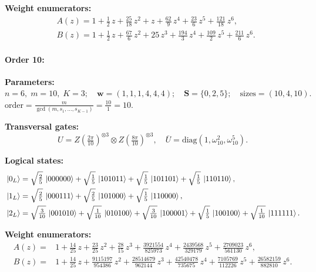 \documentclass[pdflatex,sn-nature]{sn-jnl}%
\theoremstyle{thmstyleone}%
\theoremstyle{thmstyletwo}%
\theoremstyle{thmstylethree}%
\begin{document}
\begin{appendices}
\noindent\textbf{Weight enumerators:}
\begin{align*}
    &A(z) = 1 + \tfrac{1}{2}\,z + \tfrac{25}{18}\,z^{2} + z + \tfrac{62}{9}\,z^{4} + \tfrac{23}{6}\,z^{5} + \tfrac{121}{18}\,z^{6}, \\
    &B(z) = 1 + \tfrac{1}{2}\,z + \tfrac{67}{6}\,z^{2} + 25\,z^{3} + \tfrac{194}{3}\,z^{4} + \tfrac{109}{2}\,z^{5} + \tfrac{211}{6}\,z^{6}.
\end{align*}

\paragraph{\textbf{Order 10:}}
\noindent\textbf{Parameters:} $n=6,\; m=10,\; K=3;\quad \mathbf w=(1, 1, 1, 4, 4, 4);\quad \mathbf S=\{0, 2, 5\};\quad \text{sizes}=\left(10, 4, 10\right).$ $\displaystyle \text{order}=\frac{m}{\gcd(m,s_1,\dots,s_{K-1})}=\frac{10}{1}=10.$

\noindent\textbf{Transversal gates:}
\[
    U=Z \left(\tfrac{2\pi}{10}\right)^{\otimes3} \otimes Z \left(\tfrac{8\pi}{10}\right)^{\otimes3},\quad
    \overline U=\mathrm{diag}(1,\omega_{10}^{2},\omega_{10}^{5}).
\]

\noindent\textbf{Logical states:}
\begin{align*}
  &\ket{0_L} = \sqrt{\tfrac{2}{5}}\,\ket{000000} + \sqrt{\tfrac{1}{5}}\,\ket{101011} + \sqrt{\tfrac{1}{5}}\,\ket{101101} + \sqrt{\tfrac{1}{5}}\,\ket{110110}, \\
 &\ket{1_L} = \sqrt{\tfrac{2}{5}}\,\ket{000111} + \sqrt{\tfrac{2}{5}}\,\ket{101000} + \sqrt{\tfrac{1}{5}}\,\ket{110000}, \\
 &\ket{2_L} = \sqrt{\tfrac{3}{10}}\,\ket{001010} + \sqrt{\tfrac{1}{10}}\,\ket{010100} + \sqrt{\tfrac{3}{10}}\,\ket{100001} + \sqrt{\tfrac{1}{5}}\,\ket{100100} + \sqrt{\tfrac{1}{10}}\,\ket{111111}. \\
\end{align*}

\noindent\textbf{Weight enumerators:}
\begin{align*}
    A(z) = &1 + \tfrac{14}{25}\,z + \tfrac{23}{25}\,z^{2} + \tfrac{28}{15}\,z^{3} + \tfrac{3921554}{825973}\,z^{4} + \tfrac{2439568}{329179}\,z^{5} + \tfrac{2709023}{561130}\,z^{6}, \\
    B(z) = &1 + \tfrac{14}{25}\,z + \tfrac{9115197}{954386}\,z^{2} + \tfrac{28514679}{962144}\,z^{3} + \tfrac{42540478}{735675}\,z^{4} + \tfrac{7105769}{112226}\,z^{5} + \tfrac{26582159}{882810}\,z^{6}. 
\end{align*}


\end{appendices}
\end{document}
